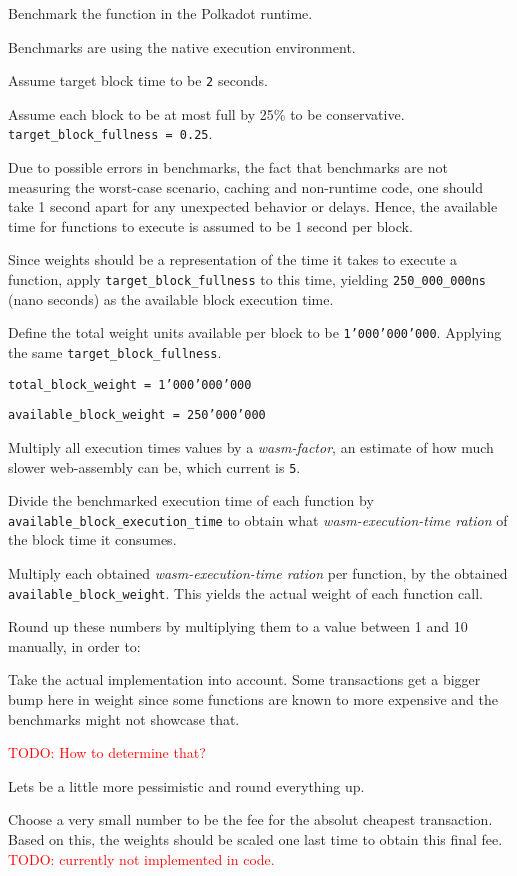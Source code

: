 \documentclass[11pt,a4paper]{article}
\newcommand{\todo}[1]{\textcolor{red}{TODO: #1}}
\newcommand{\SubItem}[1]{
    {\setlength\itemindent{15pt} \item[-] #1}
}
\begin{document}
\begin{itemize}
\item Benchmark the function in the Polkadot runtime.
\SubItem{Benchmarks are using the native execution environment.}
\item Assume target block time to be \texttt{2} seconds.
\item Assume each block to be at most full by 25\% to be conservative.
\texttt{target\_block\_fullness = 0.25}.
\item Due to possible errors in benchmarks, the fact that benchmarks are not measuring
the worst-case scenario, caching and non-runtime code, one should take 1 second
apart for any unexpected behavior or delays. Hence, the available time for functions
to execute is assumed to be 1 second per block.
\item Since weights should be a representation of the time it takes to execute
a function, apply \texttt{target\_block\_fullness} to this time, yielding
\texttt{250\_000\_000ns} (nano seconds) as the available block execution time.
\item Define the total weight units available per block to be \texttt{1'000'000'000}.
Applying the same \texttt{target\_block\_fullness}.
\SubItem{\texttt{total\_block\_weight = 1'000'000'000}}
\SubItem{\texttt{available\_block\_weight = 250'000'000}}
\item Multiply all execution times values by a \textit{wasm-factor}, an estimate of
how much slower web-assembly can be, which current is \texttt{5}.
\item Divide the benchmarked execution time of each function by
\texttt{available\_block\_execution\_time} to obtain what
\textit{wasm-execution-time ration} of the block time it
consumes.
\item Multiply each obtained \textit{wasm-execution-time ration} per function, by the
obtained\\ \texttt{available\_block\_weight}. This yields the actual weight of each
function call.
\item Round up these numbers by multiplying them to a value between 1 and 10
manually, in order to:
\SubItem{Take the actual implementation into account. Some transactions get a bigger
bump here in weight since some functions are known to more expensive and the
benchmarks might not showcase that.} \todo{How to determine that?}
\SubItem{Lets be a little more pessimistic and round everything up.}
\item Choose a very small number to be the fee for the absolut cheapest transaction.
Based on this, the weights should be scaled one last time to obtain this final fee.
\todo{currently not implemented in code.}
\end{itemize}
\end{document}
